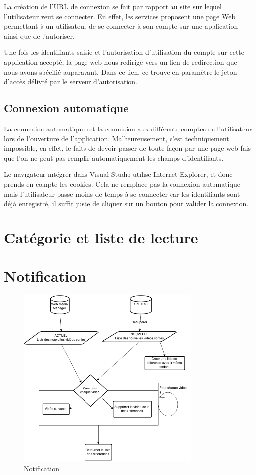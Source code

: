 \documentclass[11pt]{report} %
\begin{document}
	
	La création de l'URL de connexion se fait par rapport au site sur lequel l'utilisateur veut se connecter. En effet, les services proposent une page Web permettant à un utilisateur de se connecter à son compte sur une application ainsi que de l'autoriser.
	
	Une fois les identifiants saisie et l'autorisation d'utilisation du compte sur cette application accepté, la page web nous redirige vers un lien de redirection que nous avons spécifié auparavant. Dans ce lien, ce trouve en paramètre le jeton d'accès délivré par le serveur d'autorisation.

	\subsection{Connexion automatique}
	La connexion automatique est la connexion aux différents comptes de l'utilisateur lors de l'ouverture de l'application. Malheureusement, c'est techniquement impossible, en effet, le faits de devoir passer de toute façon par une page web fais que l'on ne peut pas remplir automatiquement les champs d'identifiants.
	
	Le navigateur intégrer dans Visual Studio utilise Internet Explorer, et donc prends en compte les cookies. Cela ne remplace pas la connexion automatique mais l'utilisateur passe moins de temps à se connecter car les identifiants sont déjà enregistré, il suffit juste de cliquer sur un bouton pour valider la connexion.
	
	\section{Catégorie et liste de lecture}
	 
	
	
	\section{Notification}
	
	\begin{figure}[h]
		\center
		\includegraphics[width=0.8\textwidth]{../img/notification.png}
		\caption{Notification}
		\label{checkNotif}
	\end{figure}
	
\end{document}
